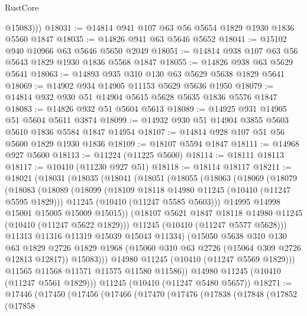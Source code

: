 \begin{lexlean}{RustCore}
\begin{coremodule}
          @15083)))
@18031 := @14814 @941 @107 @63 @56 @5654 @1829 @1930 @1836 @5560 @1847
@18035 := @14826 @941 @63 @5646 @5652
@18041 := @15102 @940 @10966 @63 @5646 @5650 @2049
@18051 := @14814 @938 @107 @63 @56 @5643 @1829 @1930 @1836 @5568 @1847
@18055 := @14826 @938 @63 @5629 @5641
@18063 := @14893 @935 @310 @130 @63 @5629 @5638 @1829 @5641
@18069 := @14902 @934 @14905 @11153 @5629 @5636 @1950
@18079 := @14814 @932 @930 @51 @14904 @5615 @5628 @5635 @1836 @5576 @1847
@18083 := @14826 @932 @51 @5604 @5613
@18089 := @14925 @931 @14905 @51 @5604 @5611 @3874
@18099 := @14932 @930 @51 @14904 @3855 @5603 @5610 @1836 @5584 @1847 @14954
@18107 := @14814 @928 @107 @51 @56 @5600 @1829 @1930 @1836
@18109 := @18107 @5594 @1847
@18111 := @14968 @927 @5600
@18113 := @11224 (@11225 @5600)
@18114 := @18111 @18113
@18117 := @10410 (@11230 @927 @51)
@18118 := @18114 @18117
@18211 := @18021
    (@18031
      (@18035
        (@18041
          (@18051
            (@18055
              (@18063
                (@18069
                  (@18079
                    (@18083
                      (@18089
                        (@18099
                          (@18109 @18118 @14980 @11245 (@10410 (@11247 @5595 @1829)))
                          @11245
                          (@10410 (@11247 @5585 @5603)))
                        @14995
                        @14998
                        @15001
                        @15005
                        @15009
                        @15015))
                    (@18107 @5621 @1847 @18118 @14980 @11245 (@10410 (@11247 @5622 @1829)))
                    @11245
                    (@10410 (@11247 @5577 @5628)))
                  @11313
                  @11316
                  @11319
                  @15039
                  @15043
                  @11334)
                (@15050
                  @5638
                  @310
                  @130
                  @63
                  @1829
                  @2726
                  @1829
                  @1968
                  (@15060 @310 @63 @2726 (@15064 @309 @2726 @12813 @12817))
                  @15083)))
            @14980
            @11245
            (@10410 (@11247 @5569 @1829)))
          @11565
          @11568
          @11571
          @11575
          @11580
          @11586))
      @14980
      @11245
      (@10410 (@11247 @5561 @1829)))
    @11245
    (@10410 (@11247 @5480 @5657))
@18271 := @17446
    (@17450
      (@17456
        (@17466
          (@17470
            (@17476
              (@17838
                (@17848
                  (@17852
                    (@17858

\end{coremodule}
\end{lexlean}
